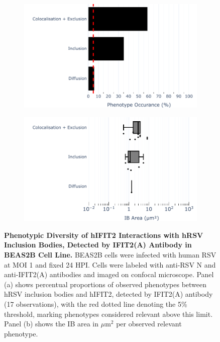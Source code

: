 \begin{figure}
    \begin{subfigure}{0.495\textwidth}
        \caption{}
        \includegraphics[width=1\linewidth]{08. Chapter 3/Figs/02. Infection/02. IFIT2/01. IFIT2A/10. bar_i2a_beas2b.pdf} 
    \end{subfigure}
    \begin{subfigure}{0.495\textwidth}
        \caption{}
        \includegraphics[width=1\linewidth]{08. Chapter 3/Figs/02. Infection/02. IFIT2/01. IFIT2A/11. box_i2a_beas2b.pdf}
    \end{subfigure}
    \caption[Phenotypic Diversity of hIFIT2 Interactions with hRSV Inclusion Bodies, Detected by IFIT2(A) Antibody in BEAS2B Cell Line.]{\textbf{Phenotypic Diversity of hIFIT2 Interactions with hRSV Inclusion Bodies, Detected by IFIT2(A) Antibody in BEAS2B Cell Line.} BEAS2B cells were infected with human RSV at MOI 1 and fixed 24 HPI. Cells were labeled with anti-RSV N and anti-IFIT2(A) antibodies and imaged on confocal microscope. Panel (a) shows percentual proportions of observed phenotypes between hRSV inclusion bodies and hIFIT2, detected by IFIT2(A) antibody (17 observations), with the red dotted line denoting the 5\% threshold, marking phenotypes considered relevant above this limit. Panel (b) shows the IB area in \(\mu \mbox{m}^2\) per observed relevant phenotype.}
    \label{fig:Phenotypic Diversity of hIFIT2 Interactions with hRSV Inclusion Bodies, Detected by IFIT2(A) Antibody in BEAS2B Cell Line}
\end{figure}

